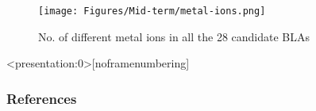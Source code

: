 \documentclass[aspectratio=169]{beamer}
\begin{document}
\begin{frame}{}
    \begin{figure}[!htbp]
          \centering
          \texttt{[image: Figures/Mid-term/metal-ions.png]}
          \vspace*{-1mm}
          \caption{No. of different metal ions in all the 28 candidate BLAs}
    \end{figure}
\end{frame}




\begin{frame}<presentation:0>[noframenumbering]

{\cite{Fukugita-1998} \cite{Shull} \cite{cen-ostriker-1999} \cite{tepper-2013} \cite{savage-2014} \cite{danforth-2016} \cite{acharya_khaire}}
    
\end{frame}
    



\begin{frame}
\renewcommand{\bibfont}{\footnotesize}
\frametitle{\huge{\textbf{References}}}




\end{frame}


\end{document}

